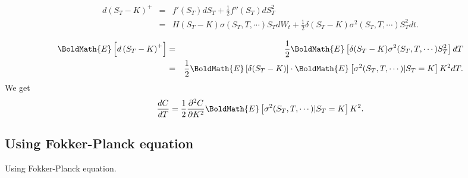 \documentclass{article}
\begin{document}
\begin{eqnarray}
	d\left(S_T -K\right)^+ &=& f'(S_T)dS_T + \frac{1}{2} f''(S_T)dS_T^2 \\
	                       &=& H(S_T-K)\sigma(S_T, T, \cdots)S_T dW_t + \frac{1}{2} \delta (S_T-K) \sigma^2(S_T, T, \cdots)S_T^2 dt.
\end{eqnarray}

\begin{eqnarray}
	\BoldMath{E}\left[d\left(S_T -K\right)^+\right]
	  &=& \frac{1}{2} \BoldMath{E}\left[\delta (S_T-K) \sigma^2(S_T, T, \cdots)S_T^2 \right] dT \\
		&=& \frac{1}{2} \BoldMath{E}\left[\delta (S_T-K)\right] \cdot \BoldMath{E}\left[\sigma^2(S_T, T, \cdots)| S_T = K\right] K^2dT.
\end{eqnarray}
We get
\begin{equation}
	\frac{dC}{dT} = \frac{1}{2} \frac{\partial^2 C}{\partial K^2}\BoldMath{E}\left[\sigma^2(S_T, T, \cdots)| S_T = K\right]K^2.
\end{equation}

\subsection{Using Fokker-Planck equation}

Using Fokker-Planck equation.


\end{document}
